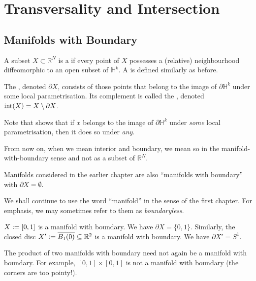 \documentclass[12pt]{article}
\begin{document}
\section{Transversality and Intersection}
\subsection{Manifolds with Boundary}

\begin{defn}
	A subset $X \subset \mathbb{R}^{N}$ is a  if every point of $X$ possesses a (relative) neighbourhood diffeomorphic to an open subset of $\mathbb{H}^{k}$. A  is defined similarly as before.

	The , denoted $\partial X$, consists of those points that belong to the image of $\partial \mathbb{H}^{k}$ under some local parametrisation. Its complement is called the , denoted $\Int(X) = X \setminus \partial X$.
\end{defn}
Note that  shows that if $x$ belongs to the image of $\partial \mathbb{H}^{k}$ under \emph{some} local parametrisation, then it does so under \emph{any}.

From now on, when we mean interior and boundary, we mean so in the manifold-with-boundary sense and not as a subset of $\mathbb{R}^{N}$. 

\begin{rem}
	Manifolds considered in the earlier chapter are also ``manifolds with boundary'' with $\partial X = \emptyset$.

	We shall continue to use the word ``manifold'' in the sense of the first chapter. For emphasis, we may sometimes refer to them as \emph{boundaryless}.
\end{rem}

\begin{ex} \label{ex:product-not-manifold-boundary}
	$X \vcentcolon= [0, 1]$ is a manifold with boundary. We have $\partial X = \{0, 1\}$. \newline
	Similarly, the closed disc $X' \vcentcolon= \overline{B_{1}(0)} \subset \mathbb{R}^{2}$ is a manifold with boundary. We have $\partial X' = S^{1}$.

	The product of two manifolds with boundary need not again be a manifold with boundary. For example, $[0, 1] \times [0, 1]$ is not a manifold with boundary (the corners are too pointy!).
\end{ex}
\end{document}
